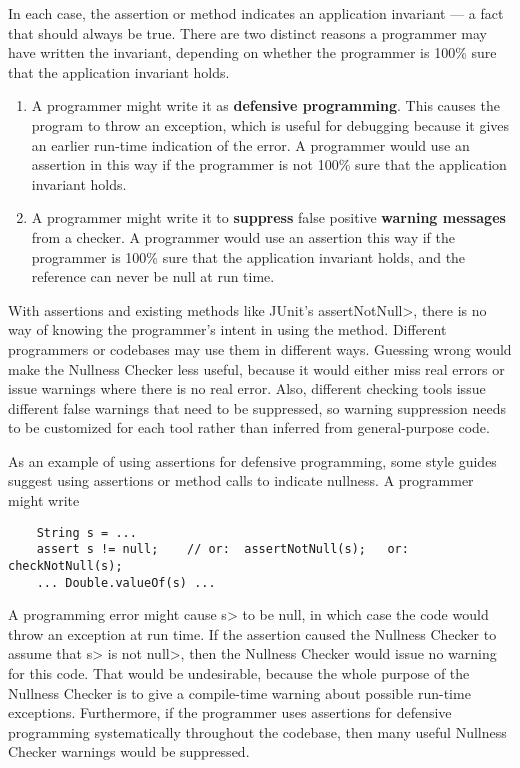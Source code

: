 In each case, the assertion or method indicates an application invariant --- a
fact that should always be true.  There are two distinct reasons a
programmer may have written the invariant, depending on whether the
programmer is 100\% sure that the application invariant holds.

\begin{enumerate}
\item
  A programmer might write it as \textbf{defensive programming}.  This causes
  the program to throw an exception, which is useful for debugging because
  it gives an earlier run-time indication of the error.
  A programmer would use an assertion in this way if the programmer is not
  100\% sure that the application invariant holds.


\item
  A programmer might write it to \textbf{suppress} false positive
  \textbf{warning messages} from a checker.  A programmer would use an
  assertion this way if the programmer is 100\% sure that the application
  invariant holds, and the reference can never be null at run time.

\end{enumerate}

With assertions and existing methods like JUnit's \<assertNotNull>, there
is no way of knowing the programmer's intent in using the method.
Different programmers or codebases may use them in different ways.
Guessing wrong would make the Nullness Checker less useful, because it
would either miss real errors or issue warnings where there is no real
error.  Also, different checking tools issue different false warnings that
need to be suppressed, so warning suppression needs to be customized for
each tool rather than inferred from general-purpose code.


As an example of using assertions for defensive programming, some style
guides suggest using assertions or method calls to indicate nullness.  A
programmer might write

\begin{Verbatim}
    String s = ...
    assert s != null;    // or:  assertNotNull(s);   or: checkNotNull(s);
    ... Double.valueOf(s) ...
\end{Verbatim}

A programming error might cause \<s> to be null, in which case the code
would throw an exception at run time.
If the assertion caused the Nullness Checker to assume that \<s> is not
\<null>, then the Nullness Checker would issue no warning for this code.
That would be undesirable, because the whole purpose of the Nullness
Checker is to give a compile-time warning about possible run-time
exceptions.  Furthermore, if the programmer uses assertions for defensive
programming systematically throughout the codebase, then many useful
Nullness Checker warnings would be suppressed.


